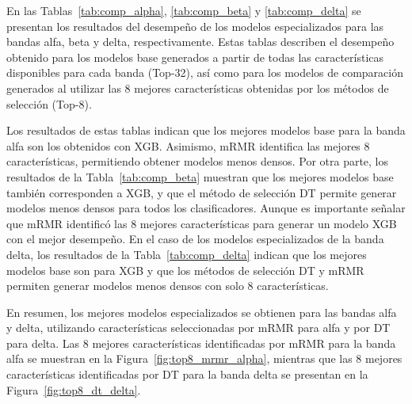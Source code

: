 \documentclass[runningheads]{llncs}
\begin{document}
En las Tablas~\ref{tab:comp_alpha}, \ref{tab:comp_beta} y \ref{tab:comp_delta} se presentan los resultados del desempeño de los modelos especializados para las bandas alfa, beta y delta, respectivamente. Estas tablas describen el desempeño obtenido para los modelos base generados a partir de todas las características disponibles para cada banda (Top-32), así como para los modelos de comparación generados al utilizar las 8 mejores características obtenidas por los métodos de selección (Top-8).

Los resultados de estas tablas indican que los mejores modelos base para la banda alfa son los obtenidos con XGB. Asimismo, mRMR identifica las mejores 8 características, permitiendo obtener modelos menos densos. Por otra parte, los resultados de la Tabla~\ref{tab:comp_beta} muestran que los mejores modelos base también corresponden a XGB, y que el método de selección DT permite generar modelos menos densos para todos los clasificadores. Aunque es importante señalar que mRMR identificó las 8 mejores características para generar un modelo XGB con el mejor desempeño. En el caso de los modelos especializados de la banda delta, los resultados de la Tabla~\ref{tab:comp_delta} indican que los mejores modelos base son para XGB y que los métodos de selección DT y mRMR permiten generar modelos menos densos con solo 8 características.

En resumen, los mejores modelos especializados se obtienen para las bandas alfa y delta, utilizando características seleccionadas por mRMR para alfa y por DT para delta. Las 8 mejores características identificadas por mRMR para la banda alfa se muestran en la Figura~\ref{fig:top8_mrmr_alpha}, mientras que las 8 mejores características identificadas por DT para la banda delta se presentan en la Figura~\ref{fig:top8_dt_delta}.
\end{document}
